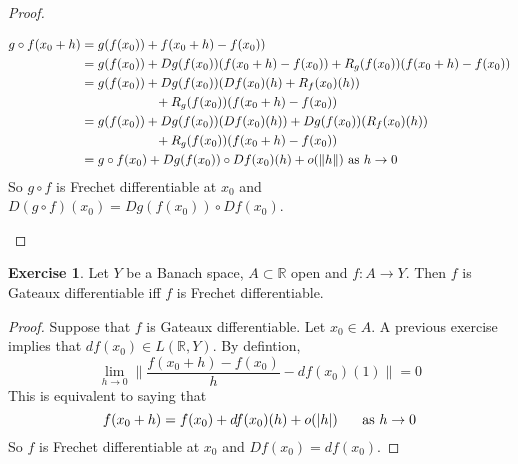 \documentclass[12pt]{amsart}
\theoremstyle{definition}
\newtheorem{ex}[definition]{Exercise}
\newcommand{\R}{\mathbb{R}}
\DeclareMathOperator*{\0}{\mbf{0}}
\DeclareMathOperator*{\1}{\mbf{1}}
\newcommand{\lex}[1]{\label{ex:#1}}
\begin{document}
\begin{proof}
\begin{itemize}
\begin{align*}
	g \circ f(x_0 + h) 
	&=  g (f(x_0)) + f(x_0 + h) - f(x_0)) \\
	&= g(f(x_0)) + Dg(f(x_0))(f(x_0 + h) - f(x_0)) + R_g(f(x_0))(f(x_0 + h) - f(x_0)) \\
	&= g(f(x_0)) + Dg(f(x_0))(Df(x_0)(h) + R_f(x_0)(h)) \\
	& \hspace{2.05cm} +  R_g(f(x_0))(f(x_0 + h) - f(x_0)) \\
	&= g(f(x_0)) + Dg(f(x_0))(Df(x_0)(h)) + Dg(f(x_0))(R_f(x_0)(h)) \\
	& \hspace{2.05cm} +  R_g(f(x_0))(f(x_0 + h) - f(x_0)) \\
	&= g \circ f(x_0) + Dg(f(x_0)) \circ Df(x_0)(h) + o(\|h\|) \text{ as } h \rightarrow 0
	\end{align*}
	So $g \circ f$ is Frechet differentiable at $x_0$ and $D(g \circ f)(x_0) = Dg(f(x_0)) \circ Df(x_0)$.
	\end{itemize}
	\end{proof}
	
	\begin{ex} \lex{62010}
	Let $Y$ be a Banach space, $A \subset \R$ open and $f:A \rightarrow Y$. Then $f$ is Gateaux differentiable iff $f$ is Frechet differentiable.
	\end{ex}
	
	\begin{proof}
	Suppose that $f$ is Gateaux differentiable. Let $x_0 \in A$. A previous exercise implies that $df(x_0) \in L(\R, Y)$. By defintion, $$  \lim_{h \rightarrow 0} \bigg \| \frac{f(x_0 + h) - f(x_0)}{h} - df(x_0)(1) \bigg \| = 0$$ 
	This is equivalent to saying that $$f(x_0 + h) = f(x_0) + df(x_0)(h) + o(|h|) \hspace{.5cm} \text{ as } h \rightarrow 0$$
	So $f$ is Frechet differentiable at $x_0$ and $Df(x_0) = df(x_0)$.
	\end{proof}
	
	
	
	
	
	
	
	
	\newpage
\end{document}
